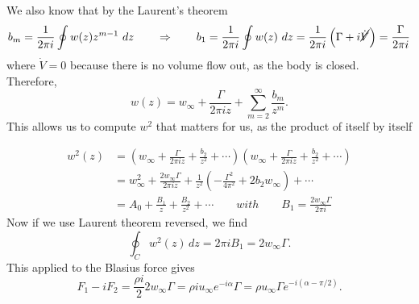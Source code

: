 	We also know that by the Laurent's theorem 
	\begin{equation}
	b_m = \frac{1}{2 \pi i} \oint w(z) z^{m-1} \ dz\qquad \Rightarrow \qquad
	b_1 = \frac{1}{2 \pi i} \oint w(z) \ dz = \frac{1}{2 \pi i} \left(\Gamma + i 	\cancel{\dot{V}}\right) = \frac{\Gamma}{2\pi i} 
	\end{equation}
	where $\dot{V}=0$ because there is no volume flow out, as the body is closed. 	Therefore,
	\begin{equation} 
	w(z) = w_\infty + \frac{\Gamma}{2 \pi i z} 
	+ \sum_{m=2}^\infty \frac{b_m}{z^m}.
	\end{equation} 
	This allows us to compute $w^2$ that matters for us, as the product of itself by itself
	
	\begin{equation}
	\begin{aligned}
	 w^2(z)&= \left( w_\infty + \frac{\Gamma}{2 \pi i z} 
	+ \frac{b_2}{z^2} + \cdots \right) \left( w_\infty + \frac{\Gamma}{2 \pi i z} 
	+ \frac{b_2}{z^2} + \cdots \right) \\
	&= w_\infty^2 + \frac{2 w_\infty \Gamma}{2 \pi i z} + \frac{1}{z^2}\left( -\frac{\Gamma ^2}{4\pi^2}+2b_2w_\infty\right) + \cdots \\
	&= A_0 + \frac{B_1}{z} + \frac{B_2}{z^2}+\cdots \qquad with \qquad B_1= \frac{2w_\infty \Gamma }{2 \pi i}
	\end{aligned}
	\end{equation}
	Now if we use Laurent theorem reversed, we find 
	\begin{equation}
		\oint _C w^2(z) \, dz = 2\pi i B_1 = 2w_\infty \Gamma .
	\end{equation}
	This applied to the Blasius force gives 
	\begin{equation}
	 F_1- iF_2 = \frac{\rho i}{2} 2w_\infty \Gamma = \rho i u_\infty e^{-i\alpha} \Gamma = \rho u_\infty \Gamma e^{-i(\alpha -\pi /2)}.
	\end{equation}

